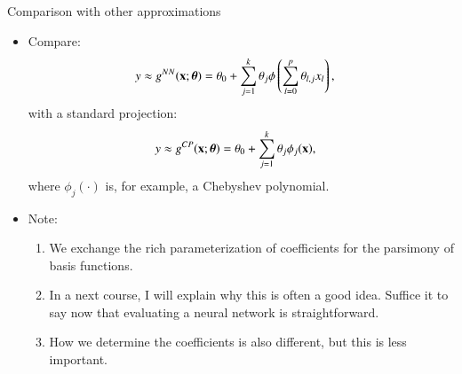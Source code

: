 \documentclass[notes, ignorenonframetext, compress, 10pt, xcolor=svgnames, aspectratio=169]{beamer}
\begin{document}
\begin{frame}[allowframebreaks]{Comparison with other approximations}
\begin{itemize}
\item Compare:
\begin{align*}
  y &\approx g^{NN}({\mathbf x}; {\boldsymbol \theta}) = \theta_0 + \sum_{j=1}^k\theta_j\phi\left(\sum_{l=0}^p \theta_{l, j}x_l\right),
\end{align*}
with a standard projection:
\begin{align*}
  y &\approx g^{CP}({\mathbf x}; {\boldsymbol \theta})=  \theta_0 + \sum_{j = 1}^k\theta_j\phi_j({\mathbf x}),
\end{align*}
where  $\phi_j(\cdot)$ is, for example, a Chebyshev polynomial.
\item Note:
\begin{enumerate}[$\cdot$]
  \item We exchange the rich parameterization of coefficients for the parsimony of basis functions.
  \item In a next course, I will explain why this is often a good idea. Suffice it to say now that evaluating a neural network is straightforward.
  \item How we determine the coefficients is also different, but this is less important.
\end{enumerate}
\end{itemize}
\end{frame}
\end{document}
